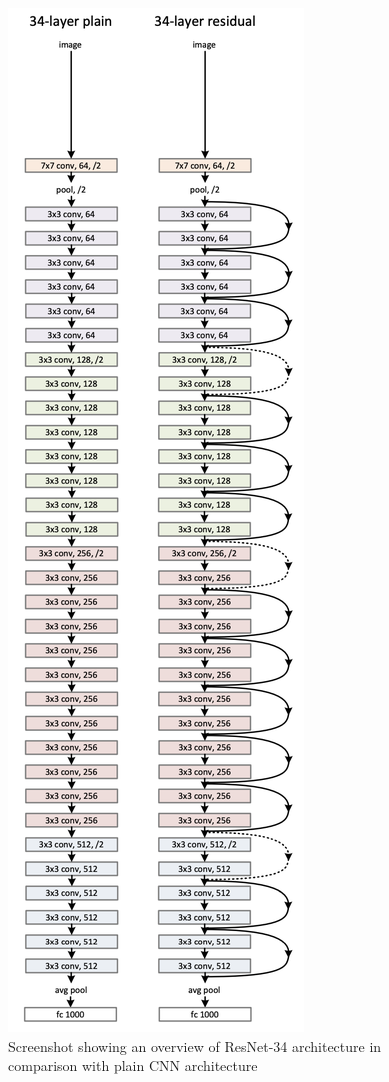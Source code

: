 \documentclass[conference]{IEEEtran}
\begin{document}
    \begin{figure}[ht!]
        \centerline{\includegraphics[scale=0.32]{figures/Screenshot 2021-12-16 at 17.28.47.png}}
        \caption{Screenshot showing an overview of ResNet-34 architecture in comparison with plain CNN architecture \cite{he2016deep}}

        \label{fig:resnet}
    \end{figure}
    
\end{document}
